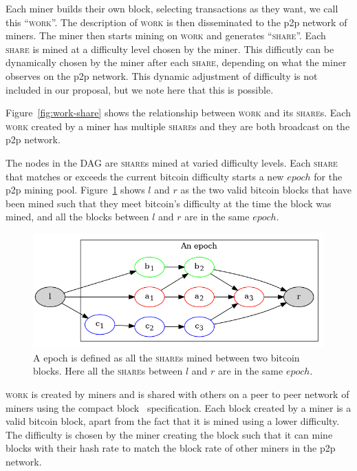 \documentclass{article}
\begin{document}
Each miner builds their own block, selecting transactions as they
want, we call this ``\textsc{work}''. The description of \textsc{work}
is then disseminated to the p2p network of miners. The miner then
starts mining on \textsc{work} and generates ``\textsc{share}''. Each
\textsc{share} is mined at a difficulty level chosen by the
miner. This difficutly can be dynamically chosen by the miner after
each \textsc{share}, depending on what the miner observes on the p2p
network. This dynamic adjustment of difficulty is not included in our
proposal, but we note here that this is possible.

Figure~\ref{fig:work-share} shows the relationship between
\textsc{work} and its \textsc{share}s. Each \textsc{work} created by a
miner has multiple \textsc{share}s and they are both broadcast on the
p2p network.

The nodes in the DAG are \textsc{share}s mined at varied difficulty
levels. Each \textsc{share} that matches or exceeds the current
bitcoin difficulty starts a new $epoch$ for the p2p mining
pool. Figure~\ref{fig:epoch} shows $l$ and $r$ as the two valid
bitcoin blocks that have been mined such that they meet bitcoin's
difficulty at the time the block was mined, and all the blocks between
$l$ and $r$ are in the same $epoch$.

\begin{figure}[h]
  \includegraphics[width=1.0\textwidth]{epoch}
  \caption{A epoch is defined as all the \textsc{share}s mined between two
    bitcoin blocks. Here all the \textsc{share}s between $l$ and $r$ are in
    the same $epoch$.}\label{fig:epoch}
\end{figure}

\textsc{work} is created by miners and is shared with others on a peer
to peer network of miners using the compact
block~\cite{compact-blocks} specification. Each block created by a
miner is a valid bitcoin block, apart from the fact that it is mined
using a lower difficulty. The difficulty is chosen by the miner
creating the block such that it can mine blocks with their hash rate
to match the block rate of other miners in the p2p network.
\end{document}

